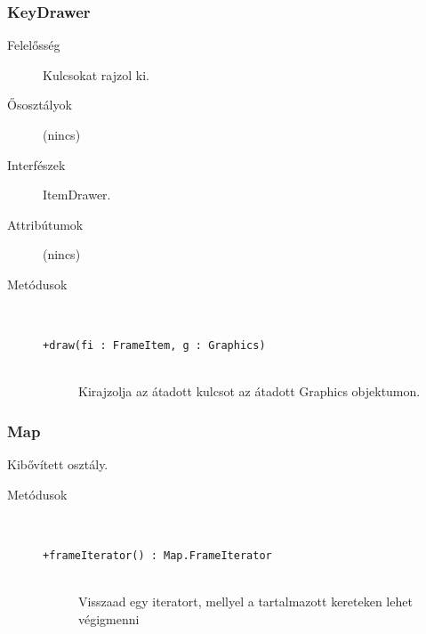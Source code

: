 		\subsubsection{KeyDrawer}
			\begin{description}

				\item[Felelősség] Kulcsokat rajzol ki.

				\item[Ősosztályok] (nincs)
				\item[Interfészek] ItemDrawer.
				\item[Attribútumok] (nincs)
				\item[Metódusok]$\ $
					\begin{description}
						\item[\texttt{+draw(fi : FrameItem, g : Graphics)}] \hfill \\Kirajzolja az átadott kulcsot az átadott Graphics objektumon. 
					\end{description}
			\end{description}

		\subsubsection{Map}
			Kibővített osztály.
			\begin{description}
				\item[Metódusok]$\ $
					\begin{description}
						\item[\texttt{+frameIterator() : Map.FrameIterator}] \hfill \\Visszaad egy iteratort, mellyel a tartalmazott kereteken lehet végigmenni 
					\end{description}
			\end{description}


